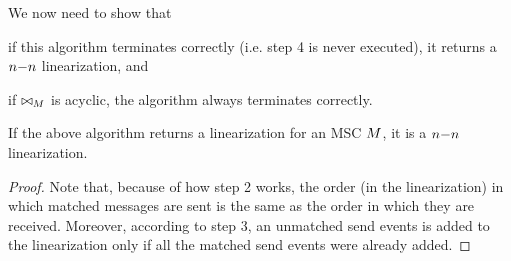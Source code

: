 \documentclass{article}
\begin{document}
We now need to show that 
\begin{enumerate*}[label={(\roman*)}]
	\item if this algorithm terminates correctly (i.e. step 4 is never executed), it returns a $n\mathsf{-}n$ linearization, and 
	\item if $\bowtie_M$ is acyclic, the algorithm always terminates correctly.
\end{enumerate*}
\begin{proposition}
	If the above algorithm returns a linearization for an MSC $M$, it is a $n\mathsf{-}n$ linearization.
\end{proposition}
\begin{proof}
	Note that, because of how step 2 works, the order (in the linearization) in which matched messages are sent is the same as the order in which they are received. Moreover, according to step 3, an unmatched send events is added to the linearization only if all the matched send events were already added.
\end{proof}
\end{document}
